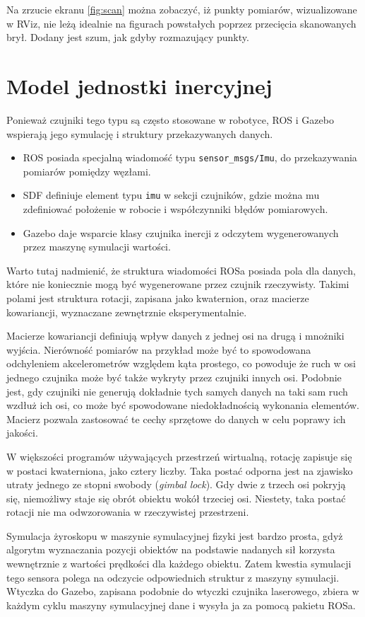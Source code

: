 			Na zrzucie ekranu \ref{fig:scan} można zobaczyć, iż punkty pomiarów, wizualizowane w RViz, nie leżą idealnie na figurach powstałych poprzez przecięcia skanowanych brył.
			Dodany jest szum, jak gdyby rozmazujący punkty.
		
\section{Model jednostki inercyjnej}
	Ponieważ czujniki tego typu są często stosowane w robotyce, ROS i Gazebo wspierają jego symulację i struktury przekazywanych danych.
	\begin{itemize}
		\item ROS posiada specjalną wiadomość typu \texttt{sensor\_msgs/Imu}, do przekazywania pomiarów pomiędzy węzłami.
		\item SDF definiuje element typu \texttt{imu} w sekcji czujników, gdzie można mu zdefiniować położenie w robocie i współczynniki błędów pomiarowych.
		\item Gazebo daje wsparcie klasy czujnika inercji z odczytem wygenerowanych przez maszynę symulacji wartości.
	\end{itemize}
	
	Warto tutaj nadmienić, że struktura wiadomości ROSa posiada pola dla danych, które nie koniecznie mogą być wygenerowane przez czujnik rzeczywisty.
	Takimi polami jest struktura rotacji, zapisana jako kwaternion, oraz macierze kowariancji, wyznaczane zewnętrznie eksperymentalnie.
	
	Macierze kowariancji definiują wpływ danych z jednej osi na drugą i mnożniki wyjścia. 
	Nierówność pomiarów na przykład może być to spowodowana odchyleniem akcelerometrów względem kąta prostego, co powoduje że ruch w osi jednego czujnika może
	być także wykryty przez czujniki innych osi. 
	Podobnie jest, gdy czujniki nie generują dokładnie tych samych danych na taki sam ruch wzdłuż ich osi, co może być spowodowane niedokładnością wykonania elementów.
	Macierz pozwala zastosować te cechy sprzętowe do danych w celu poprawy ich jakości.
	
	W większości programów używających przestrzeń wirtualną, rotację zapisuje się w postaci kwaterniona, jako cztery liczby.
	Taka postać odporna jest na zjawisko utraty jednego ze stopni swobody (\emph{gimbal lock}). Gdy dwie z trzech osi pokryją się, niemożliwy staje się obrót obiektu wokół trzeciej osi. Niestety, taka postać rotacji nie ma odwzorowania w rzeczywistej przestrzeni.
	
	Symulacja żyroskopu w maszynie symulacyjnej fizyki jest bardzo prosta, gdyż algorytm wyznaczania pozycji obiektów na podstawie nadanych sił korzysta wewnętrznie z
	wartości prędkości dla każdego obiektu. Zatem kwestia symulacji tego sensora polega na odczycie odpowiednich struktur z maszyny symulacji.
	Wtyczka do Gazebo, zapisana podobnie do wtyczki czujnika laserowego, zbiera w każdym cyklu maszyny symulacyjnej dane i wysyła ja za pomocą pakietu ROSa.
	
